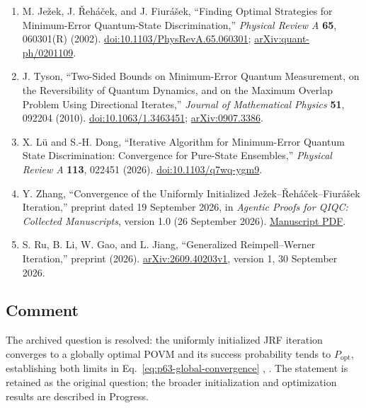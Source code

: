 \begin{enumerate}[label={},leftmargin=4.8em,labelsep=0.5em]
  \footnotesize
  \item[\textup{[JRF02]}]\label{ref:p63-jezek-rehacek-fiurasek}
  M. Je\v{z}ek, J. \v{R}eh\'{a}\v{c}ek, and J. Fiur\'{a}\v{s}ek,
  ``Finding Optimal Strategies for Minimum-Error Quantum-State
  Discrimination,'' \emph{Physical Review A} \textbf{65}, 060301(R) (2002).
  \href{https://doi.org/10.1103/PhysRevA.65.060301}{doi:10.1103/PhysRevA.65.060301};
  \href{https://arxiv.org/abs/quant-ph/0201109}{arXiv:quant-ph/0201109}.

  \item[\textup{[Tys10]}]\label{ref:p63-tyson}
  J. Tyson,
  ``Two-Sided Bounds on Minimum-Error Quantum Measurement, on the
  Reversibility of Quantum Dynamics, and on the Maximum Overlap Problem Using
  Directional Iterates,'' \emph{Journal of Mathematical Physics} \textbf{51},
  092204 (2010).
  \href{https://doi.org/10.1063/1.3463451}{doi:10.1063/1.3463451};
  \href{https://arxiv.org/abs/0907.3386}{arXiv:0907.3386}.

  \item[\textup{[LD26]}]\label{ref:p63-lu-dong}
  X. L\"u and S.-H. Dong,
  ``Iterative Algorithm for Minimum-Error Quantum State Discrimination:
  Convergence for Pure-State Ensembles,''
  \emph{Physical Review A} \textbf{113}, 022451 (2026).
  \href{https://doi.org/10.1103/q7wq-ygm9}{doi:10.1103/q7wq-ygm9}.

  \item[\textup{[Zha26]}]\label{ref:p63-zhang}
  Y. Zhang, ``Convergence of the Uniformly Initialized Je\v{z}ek--\v{R}eh\'{a}\v{c}ek--Fiur\'{a}\v{s}ek Iteration,'' preprint dated 19 September 2026, in \emph{Agentic Proofs for QIQC: Collected Manuscripts}, version 1.0 (26 September 2026). \href{https://zenodo.org/records/22969546/files/jrf-convergence.pdf}{Manuscript PDF}.

  \item[\textup{[RLGJ26]}]\label{ref:p63-ru-li-gao-jiang}
  S. Ru, B. Li, W. Gao, and L. Jiang, ``Generalized Reimpell--Werner Iteration,'' preprint (2026). \href{https://arxiv.org/abs/2609.40203v1}{arXiv:2609.40203v1}, version 1, 30 September 2026.
\end{enumerate}

\subsection*{Comment}

The archived question is resolved: the uniformly initialized JRF iteration converges to a globally optimal POVM and its success probability tends to $P_{\mathrm{opt}}$, establishing both limits in Eq.~\eqref{eq:p63-global-convergence} , . The statement is retained as the original question; the broader initialization and optimization results are described in Progress.

